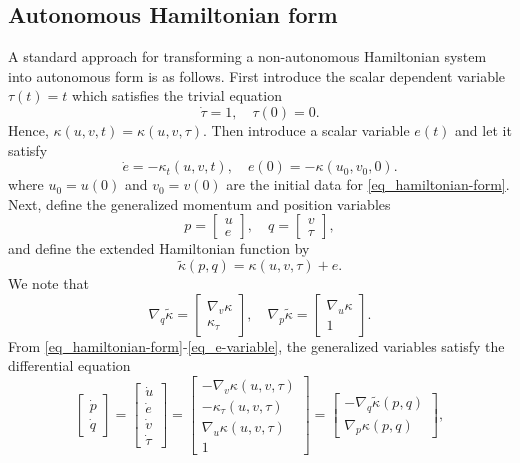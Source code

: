 \documentclass[11pt]{article}
\begin{document}
\subsection{Autonomous Hamiltonian form}
A standard approach for transforming a non-autonomous Hamiltonian system into autonomous form is as
follows. First introduce the scalar dependent variable $\tau(t)=t$ which satisfies the trivial equation
\begin{equation}
  \dot{\tau} = 1 ,\quad \tau(0)=0.
\end{equation}
Hence, $\kappa(u,v,t) = \kappa(u,v,\tau)$. Then introduce a scalar variable $e(t)$ and let it satisfy
\begin{equation}\label{eq_e-variable}
  \dot{e} = -\kappa_t(u,v,t),\quad e(0) = -\kappa(u_0, v_0, 0).
\end{equation}
where $u_0 = u(0)$ and $v_0 = v(0)$ are the initial data for \eqref{eq_hamiltonian-form}. Next,
define the generalized momentum and position variables
\[
p = \begin{bmatrix} u\\ e
\end{bmatrix},\quad
q = \begin{bmatrix} v\\ \tau
\end{bmatrix},
\]
and define the extended Hamiltonian function by
\[
\tilde{\kappa}(p,q) = \kappa(u,v,\tau) + e.
\]
We note that
\[
\nabla_{q} \tilde{\kappa} =
\begin{bmatrix}
  \nabla_v \kappa\\
  \kappa_\tau
\end{bmatrix},\quad
%
\nabla_{p} \tilde{\kappa} =
\begin{bmatrix}
  \nabla_u \kappa\\
  1
\end{bmatrix}.
\]
From \eqref{eq_hamiltonian-form}-\eqref{eq_e-variable}, the generalized variables satisfy the differential equation
\begin{equation}\label{eq_auto-hamiltonian}
\begin{bmatrix}
  \dot{p} \\
  \dot{q}
\end{bmatrix} =
%
\begin{bmatrix}
  \dot{u} \\
  \dot{e} \\
  \dot{v} \\
  \dot{\tau}
\end{bmatrix} =
%
\begin{bmatrix}
  -\nabla_v \kappa(u,v,\tau)\\
  -\kappa_\tau(u,v,\tau)\\
  \nabla_u \kappa(u,v,\tau)\\
  1
\end{bmatrix} =
%
\begin{bmatrix}
  -\nabla_q \tilde{\kappa}(p,q)\\
  \nabla_p \kappa(p,q)
\end{bmatrix},
\end{equation}
\end{document}
